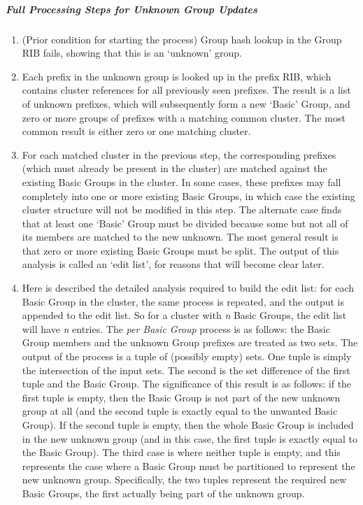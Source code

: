 \subparagraph{Full Processing Steps for Unknown Group Updates}

\begin{enumerate}
	\item (Prior condition for starting the process) Group hash lookup in the Group RIB fails, showing that this is an `unknown' group.
	\item Each prefix in the unknown group is looked up in the prefix RIB, which contains cluster references for all previously seen prefixes. The result is a list of unknown prefixes, which will subsequently form a new `Basic' Group, and zero or more groups of prefixes with a matching common cluster. The most common result is either zero or one matching cluster.
	\item For each matched cluster in the previous step, the corresponding prefixes (which must already be present in the cluster) are matched against the existing Basic Groups in the cluster. In some cases, these prefixes may fall completely into one or more existing Basic Groups, in which case the existing cluster structure will not be modified in this step. The alternate case finds that at least one `Basic' Group must be divided because some but not all of its members are matched to the new unknown. The most general result is that zero or more existing Basic Groups must be split. The output of this analysis is called an `edit list', for reasons that will become clear later.
	\item Here is described the detailed analysis required to build the edit list: for each Basic Group in the cluster, the same process is repeated, and the output is appended to the edit list. So for a cluster with \emph{n} Basic Groups, the edit list will have \emph{n} entries. The \emph{per Basic Group} process is as follows: the Basic Group members and the unknown Group prefixes are treated as two sets. The output of the process is a tuple of (possibly empty) sets. One tuple is simply the intersection of the input sets. The second is the set difference of the first tuple and the Basic Group. The significance of this result is as follows: if the first tuple is empty, then the Basic Group is not part of the new unknown group at all (and the second tuple is exactly equal to the unwanted Basic Group). If the second tuple is empty, then the whole Basic Group is included in the new unknown group (and in this case, the first tuple is exactly equal to the Basic Group). The third case is where neither tuple is empty, and this represents the case where a Basic Group must be partitioned to represent the new unknown group. Specifically, the two tuples represent the required new Basic Groups, the first actually being part of the unknown group.

\end{enumerate}
